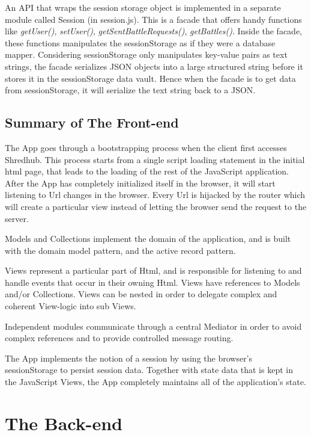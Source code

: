 An API that wraps the session storage object is implemented in a separate module called Session (in session.js). This is a facade that offers handy functions like \textit{getUser()}, \textit{setUser()}, \textit{getSentBattleRequests()}, \textit{getBattles()}. Inside the facade, these functions manipulates the sessionStorage as if they were a database mapper. Considering sessionStorage only manipulates key-value pairs as text strings, the facade serializes JSON objects into a large structured string before it stores it in the sessionStorage data vault. Hence when the facade is to get data from sessionStorage, it will serialize the text string back to a JSON. 

\subsection{Summary of The Front-end}
The App goes through a bootstrapping process when the client first accesses Shredhub. This process starts from a single script loading statement in the initial html page, that leads to the loading of the rest of the JavaScript application. After the App has completely initialized itself in the browser, it will start listening to Url changes in the browser. Every Url is hijacked by the router which will create a particular view instead of letting the browser send the request to the server.

Models and Collections implement the domain of the application, and is built with the domain model pattern, and the active record pattern.

Views represent a particular part of Html, and is responsible for listening to and handle events that occur in their owning Html. Views have references to Models and/or Collections. Views can be nested in order to delegate complex and coherent View-logic into sub Views.

Independent modules communicate through a central Mediator in order to avoid complex references and to provide controlled message routing. 

The App implements the notion of a session by using the browser's sessionStorage to persist session data. Together with state data that is kept in the JavaScript Views, the App completely maintains all of the application's state.

\section{The Back-end}
